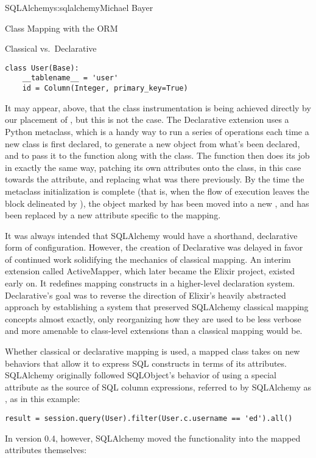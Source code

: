\begin{aosachapter}{SQLAlchemy}{s:sqlalchemy}{Michael Bayer}
\begin{aosasect1}{Class Mapping with the ORM}
\begin{aosasect2}{Classical vs.\ Declarative}
\begin{verbatim}
class User(Base):
    __tablename__ = 'user'
    id = Column(Integer, primary_key=True)
\end{verbatim}

It may appear, above, that the class instrumentation is being achieved directly
by our placement of , but this is not the case.   The Declarative
extension uses a Python metaclass, which is a handy way to run a series
of operations each time a new class is first declared, to generate a new 
object from what's been declared, and to pass it to the  function along with
the class.  The  function then does its job in exactly the same way,
patching its own attributes onto the class, in this case towards the  attribute,
and replacing what was there previously.  By the time the metaclass initialization is complete
(that is, when the flow of execution leaves the block delineated by ), the
 object marked by  has been moved into a new , and 
has been replaced by a new attribute specific to the mapping.

It was always intended that SQLAlchemy would have a
shorthand, declarative form of configuration. However, the creation of Declarative
was delayed in favor of continued work solidifying the mechanics of classical mapping.
An interim extension called ActiveMapper, which
later became the Elixir project, existed early on. It redefines mapping constructs in a higher-level
declaration system.   Declarative's goal was to reverse the direction of Elixir's heavily abstracted
approach by establishing a system that preserved SQLAlchemy classical mapping concepts almost
exactly, only reorganizing how they are used to be less verbose and more amenable to
class-level extensions than a classical mapping would be.

Whether classical or declarative mapping is used, a mapped class takes on new
behaviors that allow it to express SQL constructs in terms of its attributes.
SQLAlchemy originally followed SQLObject's behavior of using a special
attribute as the source of SQL column expressions, referred to by SQLAlchemy
as , as in this example:

\begin{verbatim}
result = session.query(User).filter(User.c.username == 'ed').all()
\end{verbatim}

In version 0.4, however, SQLAlchemy moved the functionality into the mapped
attributes themselves:


\end{aosasect2}
\end{aosasect1}
\end{aosachapter}
